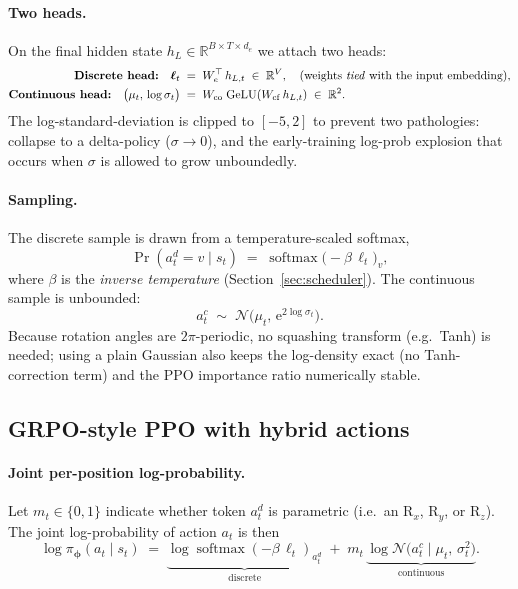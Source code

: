 \documentclass[11pt,a4paper]{article}
\newcommand{\Real}{\mathbb{R}}
\newcommand{\softmax}{\operatorname{softmax}}
\newcommand{\E}{\mathrm{e}}
\begin{document}
\paragraph{Two heads.}
On the final hidden state $h_L \in \Real^{B\times T\times d_{\!e}}$ we attach two heads:
\begin{align}
\textbf{Discrete head:}\quad
\bm{\ell}_{t} &\;=\; W_e^{\top}\,h_{L,t}
\;\in\;\Real^{V}, \quad\text{(weights \emph{tied} with the input embedding),}\\
\textbf{Continuous head:}\quad
\bigl(\mu_t,\, \log\sigma_t\bigr)
&\;=\; W_{\mathrm{co}}\;\mathrm{GeLU}(W_{\mathrm{cf}}\,h_{L,t})
\;\in\;\Real^{2}.
\end{align}
The log-standard-deviation is clipped to $[-5, 2]$ to prevent two pathologies: collapse to a delta-policy ($\sigma\to 0$), and the early-training log-prob explosion that occurs when $\sigma$ is allowed to grow unboundedly.

\paragraph{Sampling.}
The discrete sample is drawn from a temperature-scaled softmax,
\begin{equation}
\Pr(a^d_t = v\mid s_t)
\;=\;
\softmax\bigl(-\beta\,\bm{\ell}_{t}\bigr)_v,
\label{eq:beta-softmax}
\end{equation}
where $\beta$ is the \emph{inverse temperature} (Section~\ref{sec:scheduler}). The continuous sample is unbounded:
\begin{equation}
a^c_t \;\sim\; \mathcal{N}\bigl(\mu_t,\,\E^{2\log\sigma_t}\bigr).
\end{equation}
Because rotation angles are $2\pi$-periodic, no squashing transform (e.g.\ Tanh) is needed; using a plain Gaussian also keeps the log-density exact (no Tanh-correction term) and the PPO importance ratio numerically stable.


\subsection{GRPO-style PPO with hybrid actions}
\label{sec:grpo}

\paragraph{Joint per-position log-probability.}
Let $m_t \in \{0,1\}$ indicate whether token $a^d_t$ is parametric (i.e.\ an $\mathrm{R}_x$, $\mathrm{R}_y$, or $\mathrm{R}_z$). The joint log-probability of action $a_t$ is then
\begin{equation}
\log \pi_{\bm{\phi}}(a_t \mid s_t)
\;=\;
\underbrace{\log\softmax(-\beta\,\bm{\ell}_t)_{a^d_t}}_{\text{discrete}}
\;+\;
m_t\,\underbrace{\log
\mathcal{N}\bigl(a^c_t \mid \mu_t,\, \sigma_t^2\bigr)}_{\text{continuous}}.
\label{eq:joint-logp}
\end{equation}
\end{document}
